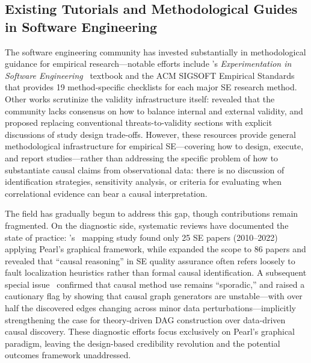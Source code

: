 \subsection{Existing Tutorials and Methodological Guides in Software Engineering}
\label{sec:bg-tutorials}

The software engineering community has invested substantially in methodological guidance for empirical research---notable efforts include \citeauthor{DBLP:books/sp/WohlinRHORW24}'s \emph{Experimentation in Software Engineering}~\cite{DBLP:books/sp/WohlinRHORW24} textbook and the ACM SIGSOFT Empirical Standards~\cite{DBLP:journals/corr/abs-2010-03525} that provides 19 method-specific checklists for each major SE research method.
Other works scrutinize the validity infrastructure itself: \citet{DBLP:conf/icse/SiegmundSA15} revealed that the community lacks consensus on how to balance internal and external validity, and \citet{DBLP:journals/tosem/RobillardAEGLNNSSS24} proposed replacing conventional threats-to-validity sections with explicit discussions of study design trade-offs.
However, these resources provide general methodological infrastructure for empirical SE---covering how to design, execute, and report studies---rather than addressing the specific problem of how to substantiate causal claims from observational data: there is no discussion of identification strategies, sensitivity analysis, or criteria for evaluating when correlational evidence can bear a causal interpretation.

The field has gradually begun to address this gap, though contributions remain fragmented.
On the diagnostic side, systematic reviews have documented the state of practice: \citeauthor{DBLP:journals/infsof/Siebert23}'s~\cite{DBLP:journals/infsof/Siebert23} mapping study found only 25 SE papers (2010--2022) applying Pearl's graphical framework, while \citet{DBLP:journals/infsof/GiamatteiGPR25} expanded the scope to 86 papers and revealed that ``causal reasoning'' in SE quality assurance often refers loosely to fault localization heuristics rather than formal causal identification.
A subsequent special issue~\cite{journals/infsof/SiebertTGWKS25} confirmed that causal method use remains ``sporadic,'' and \citet{journals/ese/HulseEM25} raised a cautionary flag by showing that causal graph generators are unstable---with over half the discovered edges changing across minor data perturbations---implicitly strengthening the case for theory-driven DAG construction over data-driven causal discovery.
These diagnostic efforts focus exclusively on Pearl's graphical paradigm, leaving the design-based credibility revolution and the potential outcomes framework unaddressed.

